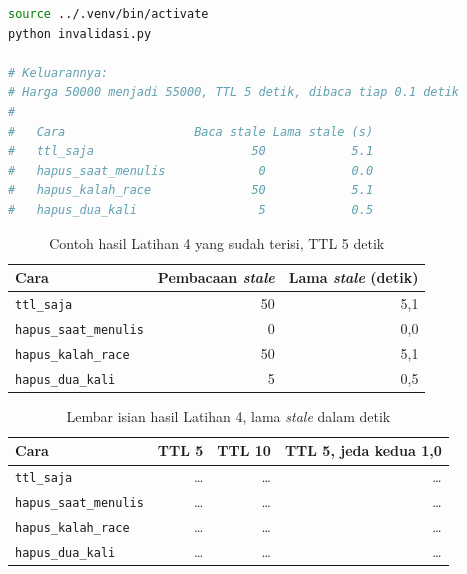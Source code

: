 \begin{lstlisting}[language=bash, caption={Mengukur lama data stale, tersedia di \berkas{sources/chapter04/invalidasi.py}}, label={lst:c4-lat4-jalan}]
source ../.venv/bin/activate
python invalidasi.py

# Keluarannya:
# Harga 50000 menjadi 55000, TTL 5 detik, dibaca tiap 0.1 detik
#
#   Cara                  Baca stale Lama stale (s)
#   ttl_saja                      50            5.1
#   hapus_saat_menulis             0            0.0
#   hapus_kalah_race              50            5.1
#   hapus_dua_kali                 5            0.5
\end{lstlisting}

\begin{table}[!htb]
  \centering
  \caption{Contoh hasil Latihan 4 yang sudah terisi, TTL 5 detik}
  \label{tab:c4-lat4-contoh}
  \begin{tabularx}{\textwidth}{Xrr}
    \hline
    \textbf{Cara} & \textbf{Pembacaan \textit{stale}} & \textbf{Lama \textit{stale} (detik)} \\
    \hline
    \texttt{ttl\_saja} & 50 & 5,1 \\
    \hline
    \texttt{hapus\_saat\_menulis} & 0 & 0,0 \\
    \hline
    \texttt{hapus\_kalah\_race} & 50 & 5,1 \\
    \hline
    \texttt{hapus\_dua\_kali} & 5 & 0,5 \\
    \hline
  \end{tabularx}
\end{table}

\begin{table}[!htb]
  \centering
  \caption{Lembar isian hasil Latihan 4, lama \textit{stale} dalam detik}
  \label{tab:c4-lat4-hasil}
  \begin{tabularx}{\textwidth}{Xrrr}
    \hline
    \textbf{Cara} & \textbf{TTL 5} & \textbf{TTL 10} & \textbf{TTL 5, jeda kedua 1,0} \\
    \hline
    \texttt{ttl\_saja} & \dots & \dots & \dots \\
    \hline
    \texttt{hapus\_saat\_menulis} & \dots & \dots & \dots \\
    \hline
    \texttt{hapus\_kalah\_race} & \dots & \dots & \dots \\
    \hline
    \texttt{hapus\_dua\_kali} & \dots & \dots & \dots \\
    \hline
  \end{tabularx}
\end{table}

